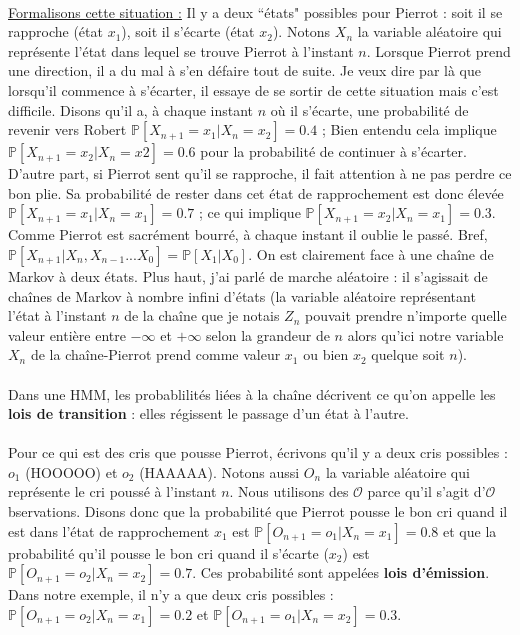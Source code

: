 \documentclass{article}
\begin{document}
\\
\underline{Formalisons cette situation :} Il y a deux ``états" possibles pour Pierrot : soit il se rapproche (état $x_1$), soit il s'écarte (état $x_2$). Notons $X_n$ la variable aléatoire qui représente l'état dans lequel se trouve Pierrot à l'instant $n$. Lorsque Pierrot prend une direction, il a du mal à s'en défaire tout de suite. Je veux dire par là que lorsqu'il commence à s'écarter, il essaye de se sortir de cette situation mais c'est difficile. Disons qu'il a, à chaque instant $n$ où il s'écarte, une probabilité de revenir vers Robert $\mathbb{P}[X_{n+1} = x_1 \vert X_n=x_2] = 0.4$ ; Bien entendu cela implique $\mathbb{P}[X_{n+1} = x_2 \vert X_n=x2] = 0.6$ pour la probabilité de continuer à s'écarter. D'autre part, si Pierrot sent qu'il se rapproche, il fait attention à ne pas perdre ce bon plie. Sa probabilité de rester dans cet état de rapprochement est donc élevée $\mathbb{P}[X_{n+1} = x_1 \vert X_n=x_1] = 0.7$ ; ce qui implique $\mathbb{P}[X_{n+1} = x_2 \vert X_n=x_1] = 0.3$. Comme Pierrot est sacrément bourré, à chaque instant il oublie le passé. Bref, $\mathbb{P}[X_{n+1} \vert X_n, X_{n-1} ... X_0] = \mathbb{P}[X_{1} \vert X_0]$. On est clairement face à une chaîne de Markov à deux états. Plus haut, j'ai parlé de marche aléatoire : il s'agissait de chaînes de Markov à nombre infini d'états (la variable aléatoire représentant l'état à l'instant $n$ de la chaîne que je notais $Z_n$ pouvait prendre n'importe quelle valeur entière entre $-\infty$ et $+\infty$ selon la grandeur de $n$ alors qu'ici notre variable $X_n$ de la chaîne-Pierrot prend comme valeur $x_1$ ou bien $x_2$ quelque soit $n$). \\
\\
Dans une HMM, les probablilités liées à la chaîne décrivent ce qu'on appelle les
\textbf{lois de transition} : elles régissent le passage d'un état à l'autre. \\
\\
Pour ce qui est des cris que pousse Pierrot, écrivons qu'il y a deux cris  possibles : $o_1$ (HOOOOO) et $o_2$ (HAAAAA). Notons aussi $O_n$ la variable aléatoire qui représente le cri poussé à l'instant $n$. Nous utilisons des $\mathcal{O}$ parce qu'il s'agit d'$\mathcal{O}$bservations. Disons donc que la probabilité que Pierrot pousse le bon cri quand il est dans l'état de rapprochement $x_1$ est $\mathbb{P}[O_{n+1} = o_1 \vert X_n=x_1] = 0.8$ et que la probabilité qu'il pousse le bon cri quand il s'écarte ($x_2$) est $\mathbb{P}[O_{n+1} = o_2 \vert X_n=x_2] = 0.7$. Ces probabilité sont appelées \textbf{lois d'émission}. Dans notre exemple, il n'y a que deux cris possibles : $\mathbb{P}[O_{n+1} = o_2 \vert X_n=x_1] = 0.2$ et $\mathbb{P}[O_{n+1} = o_1 \vert X_n=x_2] = 0.3$. \\
\end{document}
